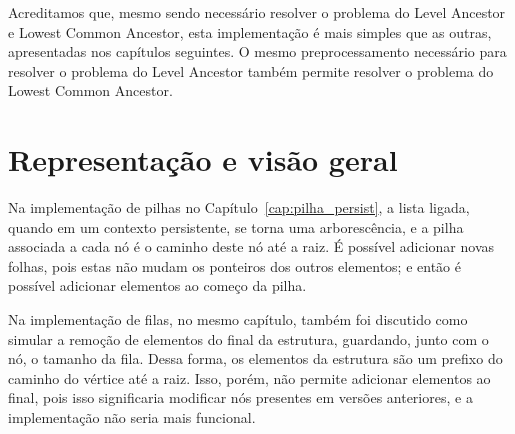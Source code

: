 \documentclass[main.tex]{subfiles}
\begin{document}
Acreditamos que, mesmo sendo necessário resolver o problema do Level Ancestor e Lowest Common Ancestor, esta implementação é mais simples que as outras, apresentadas nos capítulos seguintes. O mesmo preprocessamento necessário para resolver o problema do Level Ancestor também permite resolver o problema do Lowest Common Ancestor.

\section{Representação e visão geral}

Na implementação de pilhas no Capítulo~\ref{cap:pilha_persist}, a lista ligada, quando em um contexto persistente, se torna uma arborescência, e a pilha associada a cada nó é o caminho deste nó até a raiz. É possível adicionar novas folhas, pois estas não mudam os ponteiros dos outros elementos; e então é possível adicionar elementos ao começo da pilha.

Na implementação de filas, no mesmo capítulo, também foi discutido como simular a remoção de elementos do final da estrutura, guardando, junto com o nó, o tamanho da fila. Dessa forma, os elementos da estrutura são um prefixo do caminho do vértice até a raiz. Isso, porém, não permite adicionar elementos ao final, pois isso significaria modificar nós presentes em versões anteriores, e a implementação não seria mais funcional.
\end{document}
